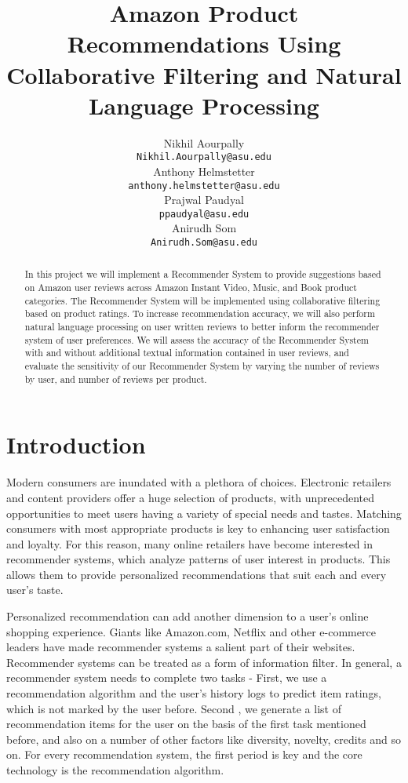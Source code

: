 \documentclass{article} %
\title{Amazon Product Recommendations Using Collaborative Filtering and Natural Language Processing  }
\author{
Nikhil Aourpally \\
\texttt{Nikhil.Aourpally@asu.edu} \\
\And
Anthony Helmstetter \\
\texttt{anthony.helmstetter@asu.edu} \\
\And
Prajwal Paudyal \\
\texttt{ppaudyal@asu.edu} \\
\And
Anirudh Som \\
\texttt{Anirudh.Som@asu.edu} \\
}
\begin{document}
\maketitle

\begin{abstract}
In this project we will implement a Recommender System to provide suggestions based on Amazon user reviews across Amazon Instant Video, Music, and Book product categories. The Recommender System will be implemented using collaborative filtering based on product ratings. To increase recommendation accuracy, we will also perform natural language processing on user written reviews to better inform the recommender system of user preferences. We will assess the accuracy of the Recommender System with and without additional textual information contained in user reviews, and evaluate the sensitivity of our Recommender System by varying the number of reviews by user, and number of reviews per product. 
\end{abstract}


\section{Introduction}
Modern consumers are inundated with a plethora of choices. Electronic retailers and content providers offer a huge selection of products, with unprecedented opportunities to meet users having a variety of special needs and tastes. Matching consumers with most appropriate products is key to enhancing user satisfaction and loyalty. For this reason, many online retailers have become interested in recommender systems, which analyze patterns of user interest in products. This allows them to provide personalized recommendations that suit each and every user's taste.

Personalized recommendation can add another dimension to a user's online shopping experience. Giants like Amazon.com, Netflix and other e-commerce leaders have made recommender systems a salient part of their websites. Recommender systems can be treated as a form of information filter. In general, a recommender system needs to complete two tasks \cite{RCHB2010}- First, we use a recommendation algorithm and the user's history logs to predict item ratings\cite{AUIRM}, which is not marked by the user before. Second \cite{WBKNN2013}, we generate a list of recommendation items for the user on the basis of the first task mentioned before, and also on a number of other factors like diversity, novelty, credits and so on. For every recommendation system, the first period is key and the core technology is the recommendation algorithm.
\end{document}
